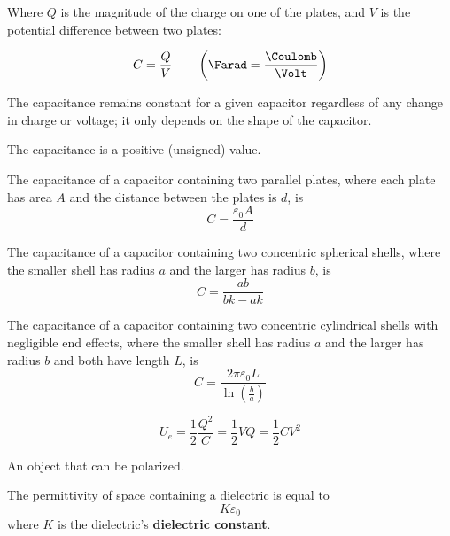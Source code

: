 \begin{definition}[Capacitance]
  Where $Q$ is the magnitude of the charge on one of the plates, and $V$ is the potential difference between two plates:

  \[
    C = \frac{Q}{V} \qquad \left(\Farad = \frac{\Coulomb}{\Volt}\right)
  \]

  The capacitance remains constant for a given capacitor regardless of any change in charge or voltage; it only depends on the shape of the capacitor.

  The capacitance is a positive (unsigned) value.
\end{definition}

\begin{example}
  The capacitance of a capacitor containing two parallel plates, where each plate has area $A$ and the distance between the plates is $d$, is
  \[
    C = \frac{\varepsilon_0 A}{d}
  \]
\end{example}

\begin{example}
  The capacitance of a capacitor containing two concentric spherical shells, where the smaller shell has radius $a$ and the larger has radius $b$, is
  \[
    C = \frac{ab}{bk - ak}
  \]
\end{example}

\begin{example}
  The capacitance of a capacitor containing two concentric cylindrical shells with negligible end effects, where the smaller shell has radius $a$ and the larger has radius $b$ and both have length $L$, is
  \[
    C = \frac{2 \pi \varepsilon_0 L}{\ln\left(\frac{b}{a}\right)}
  \]
\end{example}

\begin{theorem}
  \[
    U_e = \frac{1}{2} \frac{Q^2}{C} = \frac{1}{2} VQ = \frac{1}{2} C V^2
  \]
\end{theorem}

\begin{definition}[Dielectric]
  An object that can be polarized.
\end{definition}

\begin{definition}[Permittivity]
  The permittivity of space containing a dielectric is equal to
  \[
    K\varepsilon_0
  \]
  where $K$ is the dielectric's \textbf{dielectric constant}.
\end{definition}

